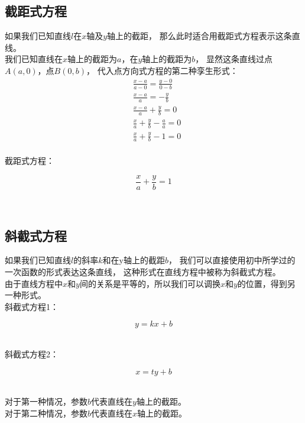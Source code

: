 \documentclass[UTF8]{ctexart}
\begin{document}
\newpage

\subsection{截距式方程}
    如果我们已知直线$l$在$x$轴及$y$轴上的截距，
    那么此时适合用截距式方程表示这条直线。\\[3mm]
    我们已知直线在$x$轴上的截距为$a$，在$y$轴上的截距为$b$，
    显然这条直线过点$A(a,0)$，点$B(0,b)$，
    代入点方向式方程的第二种孪生形式：
    \vspace{5pt}
    \setcounter{equation}{0}
    \begin{align}
        &\frac{x-a}{a-0}=\frac{y-0}{0-b}\\[4mm]
        &\frac{x-a}{a}=-\frac{y}{b}\\[4mm]
        &\frac{x-a}{a}+\frac{y}{b}=0\\[4mm]
        &\frac{x}{a}+\frac{y}{b}-\frac{a}{a}=0\\[4mm]
        &\frac{x}{a}+\frac{y}{b}-1=0
    \end{align}\\
    截距式方程：
    \begin{large}
        \begin{equation*}
            \frac{x}{a}+\frac{y}{b}=1
        \end{equation*}
    \end{large}\\

\subsection{斜截式方程}
    如果我们已知直线$l$的斜率$k$和在y轴上的截距$b$，
    我们可以直接使用初中所学过的一次函数的形式表达这条直线，
    这种形式在直线方程中被称为斜截式方程。\\[3mm]
    由于直线方程中$x$和$y$间的关系是平等的，所以我们可以调换$x$和$y$的位置，得到另一种形式。\\[3mm]
    斜截式方程1：
    \begin{large}
        \begin{equation*}
            y=kx+b
        \end{equation*}
    \end{large}\\
    斜截式方程2：
    \begin{large}
        \begin{equation*}
            x=ty+b
        \end{equation*}
    \end{large}\\
    对于第一种情况，参数$b$代表直线在$y$轴上的截距。\\[2mm]
    对于第二种情况，参数$b$代表直线在$x$轴上的截距。\\[2mm]
\end{document}
